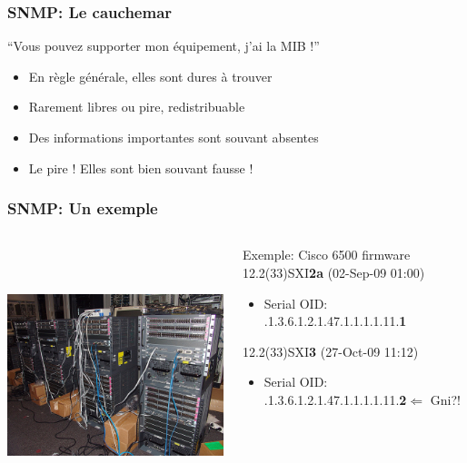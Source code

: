 \documentclass{beamer}
\begin{document}
\begin{frame}
    \frametitle{SNMP: Le cauchemar}

    \begin{block}{“Vous pouvez supporter mon équipement, j'ai la MIB !”}

    \pause
    \begin{itemize}
    \item En règle générale, elles sont dures à trouver
    \item Rarement libres ou pire, redistribuable
    \item Des informations importantes sont souvant absentes
    \item Le pire ! Elles sont bien souvant fausse !
    \end{itemize}
    \end{block}

\end{frame}
\begin{frame}
    \frametitle{SNMP: Un exemple}

 \begin{columns}
 \begin{column}{0.35\textwidth}
         \includegraphics[height=7.5cm]{./pics/cisco.jpg}
 \end{column}
 \begin{column}{0.65\textwidth}
    \begin{block}{Exemple: Cisco 6500 firmware}
    12.2(33)SXI\textbf{2a} (02-Sep-09 01:00)
    \begin{itemize}
    \item Serial OID: .1.3.6.1.2.1.47.1.1.1.1.11.\textbf{1}
    \end{itemize}
    12.2(33)SXI\textbf{3} (27-Oct-09 11:12)
    \begin{itemize}
    \item Serial OID: .1.3.6.1.2.1.47.1.1.1.1.11.\textbf{2}$\Longleftarrow$ Gni?!
    \end{itemize}
    \end{block}

 \end{column}
\end{columns}


    
\end{frame}
\end{document}
